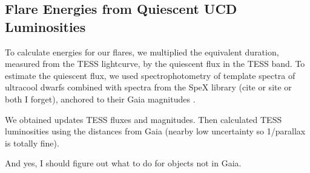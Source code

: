 \documentclass[twocolumn]{aastex62}
\begin{document}

\subsection{Flare Energies from Quiescent UCD Luminosities} \label{subsec:tessmag}
To calculate energies for our flares, we multiplied the equivalent duration, measured from the TESS lightcurve, by the quiescent flux in the TESS band. To estimate the quiescent flux, we used spectrophotometry of template spectra of ultracool dwarfs \citep{Bochanski2007a,Schmidt2014a} combined with spectra from the SpeX library (cite or site or both I forget), anchored to their Gaia magnitudes \citep{Gaia-Collaboration2018}. 

We obtained updates TESS fluxes and magnitudes. Then calculated TESS luminosities using the distances from Gaia (nearby low uncertainty so 1/parallax is totally fine). 

And yes, I should figure out what to do for objects not in Gaia. 
\end{document}
